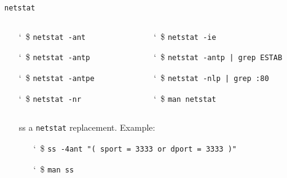 \begin{frame}{\texttt{netstat}}
  \begin{columns}
    \begin{column}{.35\linewidth}
    \begin{itemize}
    \item[\char`~\$] \texttt{netstat -ant}
    \item[\char`~\$] \texttt{netstat -antp}
    \item[\char`~\$] \texttt{netstat -antpe}
    \item[\char`~\$] \texttt{netstat -nr}
    \end{itemize}
    \end{column}
    \begin{column}{.65\linewidth}
    \begin{itemize}
    \item[\char`~\$] \texttt{netstat -ie}
    \item[\char`~\$] \texttt{netstat -antp | grep ESTAB}
    \item[\char`~\$] \texttt{netstat -nlp | grep :80}
    \item[\char`~\$] \texttt{man netstat}
    \end{itemize}
    \end{column}
  \end{columns}
  \vspace*{2em}
  \begin{itemize}
  \item[ss] a \texttt{netstat} replacement. Example:
    \begin{itemize}
    \item[\char`~\$] \texttt{ss -4ant "( sport = 3333 or dport = 3333 )"}
    \item[\char`~\$] \texttt{man ss} 
    \end{itemize}
  \end{itemize}
\end{frame}


